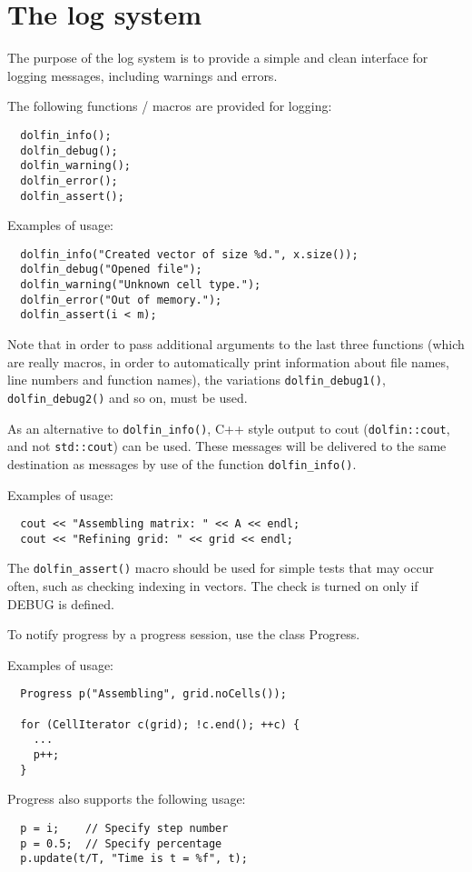 \chapter{The log system}


The purpose of the log system is to provide a simple and
clean interface for logging messages, including warnings
and errors.

The following functions / macros are provided for logging:

\begin{verbatim}
  dolfin_info();
  dolfin_debug();
  dolfin_warning();
  dolfin_error();
  dolfin_assert();
\end{verbatim}

Examples of usage:

\begin{verbatim}
  dolfin_info("Created vector of size %d.", x.size());
  dolfin_debug("Opened file");
  dolfin_warning("Unknown cell type.");
  dolfin_error("Out of memory.");
  dolfin_assert(i < m);
\end{verbatim}

Note that in order to pass additional arguments to the last
three functions (which are really macros, in order to
automatically print information about file names, line numbers
and function names), the variations \texttt{dolfin\_debug1()},
\texttt{dolfin\_debug2()} and so on, must be used.

As an alternative to \texttt{dolfin\_info()}, C++ style output to cout
(\texttt{dolfin::cout}, and not \texttt{std::cout}) can be used. These messages
will be delivered to the same destination as messages by use
of the function \texttt{dolfin\_info()}.

Examples of usage:

\begin{verbatim}
  cout << "Assembling matrix: " << A << endl;
  cout << "Refining grid: " << grid << endl;
\end{verbatim}

The \texttt{dolfin\_assert()} macro should be used for simple tests that
may occur often, such as checking indexing in vectors. The check
is turned on only if DEBUG is defined.

To notify progress by a progress session, use the class
Progress.

Examples of usage:

\begin{verbatim}
  Progress p("Assembling", grid.noCells());
  
  for (CellIterator c(grid); !c.end(); ++c) {
    ...
    p++;
  }
\end{verbatim}

Progress also supports the following usage:

\begin{verbatim}
  p = i;    // Specify step number
  p = 0.5;  // Specify percentage
  p.update(t/T, "Time is t = %f", t);
\end{verbatim}
